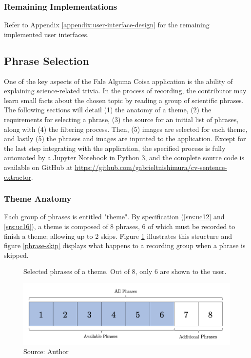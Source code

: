 \subsubsection{Remaining Implementations}

Refer to Appendix \ref{appendix:user-interface-design} for the remaining implemented user interfaces.

\clearpage
\subsection{Phrase Selection}
\label{sec:app-phrase-selection}

One of the key aspects of the Fale Alguma Coisa application is the ability of explaining science-related trivia. In the process of recording, the contributor may learn small facts about the chosen topic by reading a group of scientific phrases. The following sections will detail (1) the anatomy of a theme, (2) the requirements for selecting a phrase, (3) the source for an initial list of phrases, along with (4) the filtering process. Then, (5) images are selected for each theme, and lastly (5) the phrases and images are inputted to the application. Except for the last step integrating with the application, the specified process is fully automated by a Jupyter Notebook in Python 3, and the complete source code is available on GitHub at \url{https://github.com/gabrieltnishimura/cv-sentence-extractor}.

\subsubsection{Theme Anatomy}

Each group of phrases is entitled "theme". By specification (\ref{srs:uc12} and \ref{srs:uc16}), a theme is composed of 8 phrases, 6 of which must be recorded to finish a theme; allowing up to 2 skips. Figure \ref{fig:falealgumacoisa-phrase-all} illustrates this structure and figure \ref{phrase-skip} displays what happens to a recording group when a phrase is skipped.

\begin{figure}[h]
    \centering
    \caption{Selected phrases of a theme. Out of 8, only 6 are shown to the user.}
    \includegraphics[width=\linewidth]{images/phrase-selection/phrase-all.png}
    \caption*{Source: Author}
    \label{fig:falealgumacoisa-phrase-all}
\end{figure}

